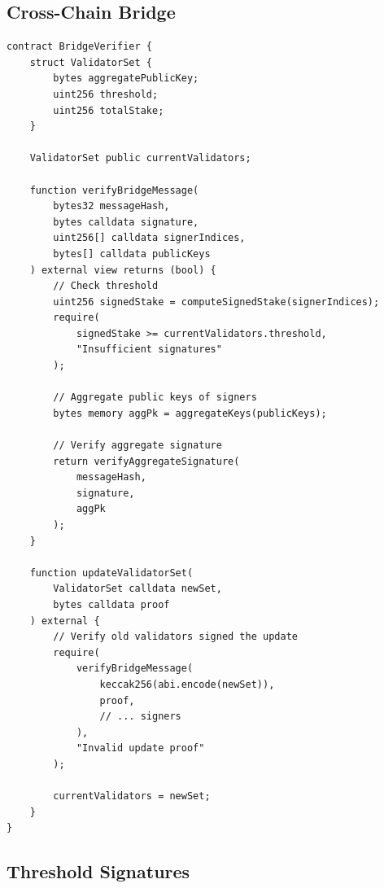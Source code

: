 \documentclass[11pt,a4paper]{article}
\theoremstyle{definition}
\begin{document}
\subsection{Cross-Chain Bridge}

\begin{lstlisting}[language=Solidity]
contract BridgeVerifier {
    struct ValidatorSet {
        bytes aggregatePublicKey;
        uint256 threshold;
        uint256 totalStake;
    }

    ValidatorSet public currentValidators;

    function verifyBridgeMessage(
        bytes32 messageHash,
        bytes calldata signature,
        uint256[] calldata signerIndices,
        bytes[] calldata publicKeys
    ) external view returns (bool) {
        // Check threshold
        uint256 signedStake = computeSignedStake(signerIndices);
        require(
            signedStake >= currentValidators.threshold,
            "Insufficient signatures"
        );

        // Aggregate public keys of signers
        bytes memory aggPk = aggregateKeys(publicKeys);

        // Verify aggregate signature
        return verifyAggregateSignature(
            messageHash,
            signature,
            aggPk
        );
    }

    function updateValidatorSet(
        ValidatorSet calldata newSet,
        bytes calldata proof
    ) external {
        // Verify old validators signed the update
        require(
            verifyBridgeMessage(
                keccak256(abi.encode(newSet)),
                proof,
                // ... signers
            ),
            "Invalid update proof"
        );

        currentValidators = newSet;
    }
}
\end{lstlisting}

\subsection{Threshold Signatures}
\end{document}
